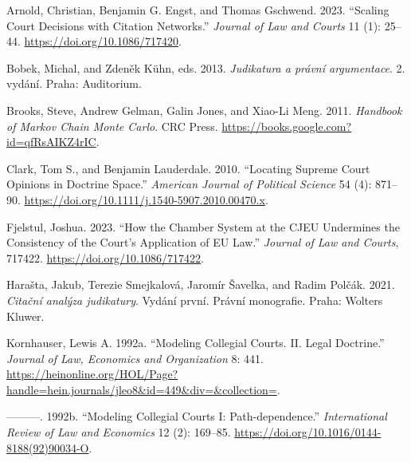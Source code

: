 \documentclass[
  11pt,
]{article}
\newlength{\cslhangindent}
\newenvironment{CSLReferences}[2] %
 {%
  \setlength{\parindent}{0pt}
  \ifodd #1 \everypar{\setlength{\hangindent}{\cslhangindent}}\ignorespaces\fi
  \ifnum #2 > 0
  \setlength{\parskip}{#2\baselineskip}
  \fi
 }%
 {}
\begin{document}
\hypertarget{refs}{}
\begin{CSLReferences}{1}{0}
\leavevmode{}%
Arnold, Christian, Benjamin G. Engst, and Thomas Gschwend. 2023.
{``Scaling {Court Decisions} with {Citation Networks}.''} \emph{Journal
of Law and Courts} 11 (1): 25--44. \url{https://doi.org/10.1086/717420}.

\leavevmode{}%
Bobek, Michal, and Zdeněk Kühn, eds. 2013. \emph{Judikatura a právní
argumentace}. 2. vydání. {Praha}: {Auditorium}.

\leavevmode{}%
Brooks, Steve, Andrew Gelman, Galin Jones, and Xiao-Li Meng. 2011.
\emph{Handbook of {Markov Chain Monte Carlo}}. {CRC Press}.
\url{https://books.google.com?id=qfRsAIKZ4rIC}.

\leavevmode{}%
Clark, Tom S., and Benjamin Lauderdale. 2010. {``Locating {Supreme Court
Opinions} in {Doctrine Space}.''} \emph{American Journal of Political
Science} 54 (4): 871--90.
\url{https://doi.org/10.1111/j.1540-5907.2010.00470.x}.

\leavevmode{}%
Fjelstul, Joshua. 2023. {``How the {Chamber System} at the {CJEU
Undermines} the {Consistency} of the {Court}'s {Application} of {EU
Law}.''} \emph{Journal of Law and Courts}, 717422.
\url{https://doi.org/10.1086/717422}.

\leavevmode{}%
Harašta, Jakub, Terezie Smejkalová, Jaromír Šavelka, and Radim Polčák.
2021. \emph{Citační analýza judikatury}. Vydání první. Právní
monografie. {Praha}: {Wolters Kluwer}.

\leavevmode{}%
Kornhauser, Lewis A. 1992a. {``Modeling {Collegial Courts}. {II}. {Legal
Doctrine}.''} \emph{Journal of Law, Economics and Organization} 8: 441.
\url{https://heinonline.org/HOL/Page?handle=hein.journals/jleo8&id=449&div=&collection=}.

\leavevmode{}%
---------. 1992b. {``Modeling Collegial Courts {I}:
{Path-dependence}.''} \emph{International Review of Law and Economics}
12 (2): 169--85. \url{https://doi.org/10.1016/0144-8188(92)90034-O}.


\end{CSLReferences}
\end{document}
